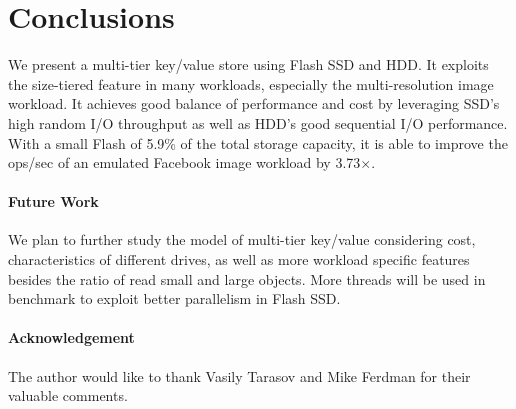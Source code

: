 \section{Conclusions}
\label{sec:conc}
We present a multi-tier key/value store using Flash SSD and HDD. It
exploits the size-tiered feature in many workloads, especially the
multi-resolution image workload. It achieves good balance of
performance and cost by leveraging SSD's high random I/O throughput as
well as HDD's good sequential I/O performance. With a small Flash of
5.9\% of the total storage capacity, it is able to improve the ops/sec
of an emulated Facebook image workload by 3.73$\times$.

\paragraph{Future Work}
We plan to further study the model of multi-tier key/value considering
cost, characteristics of different drives, as well as more workload
specific features besides the ratio of read small and large objects.
More threads will be used in benchmark to exploit better parallelism
in Flash SSD.

\paragraph{Acknowledgement}
The author would like to thank Vasily Tarasov and Mike Ferdman for
their valuable comments.


